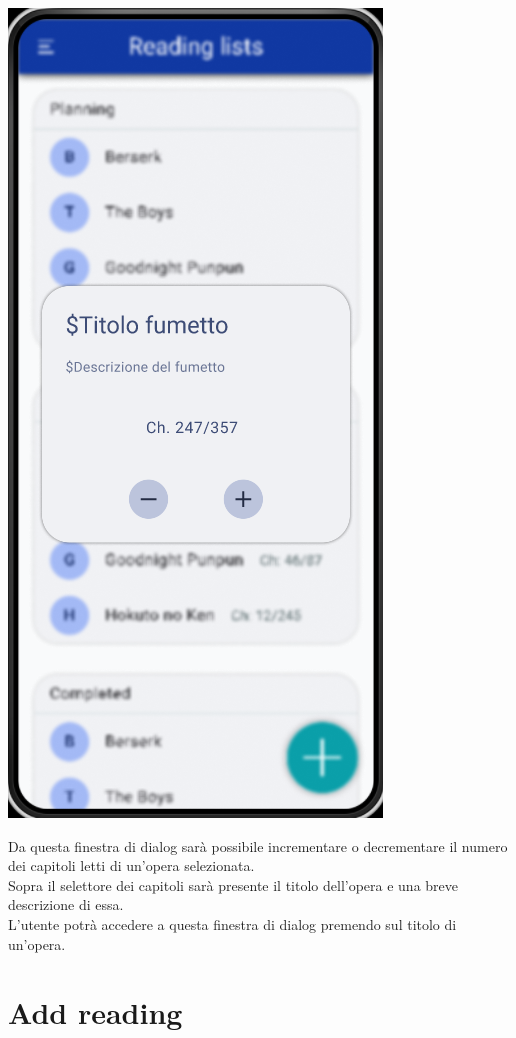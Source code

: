 \documentclass{report}
\begin{document}
\begin{center}
   \includegraphics[scale=0.4]{info_reading.png}
\end{center}

Da questa finestra di dialog sarà possibile incrementare o decrementare il numero dei capitoli letti di un'opera selezionata.\\
Sopra il selettore dei capitoli sarà presente il titolo dell'opera e una breve descrizione di essa.\\
L'utente potrà accedere a questa finestra di dialog premendo sul titolo di un'opera.\\

\section{Add reading}
\end{document}
